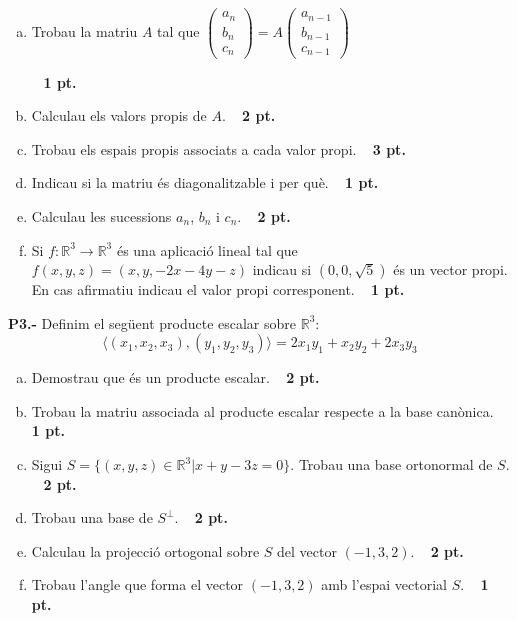 \documentclass{report}
\newcommand\R{\mathbb{R}}
\begin{document}
\begin{enumerate}[a)]
\item Trobau la matriu $A$ tal que 
$\left( \begin{array}{c} a_n \\ b_n \\ c_n \end{array} \right) = A \left( \begin{array}{c} a_{n-1} \\ b_{n-1} \\ c_{n-1} \end{array} \right)$

\ \hfill{\textbf{ 1 pt.}}

\item Calculau els valors propis de $A$.
\ \hfill{\textbf{ 2 pt.}}

\item Trobau els espais propis associats a cada valor propi.
\ \hfill{\textbf{ 3 pt.}}

\item Indicau si la matriu és diagonalitzable i per què.
\ \hfill{\textbf{ 1 pt.}}

\item Calculau les sucessions $a_n$, $b_n$ i $c_n$.
\ \hfill{\textbf{ 2 pt.}}

\item Si $f: \R^3 \rightarrow \R^3$ és una aplicació lineal tal que 
$f(x, y, z)=(x, y, -2x-4y-z)$ indicau si $(0, 0, \sqrt{5})$ és
un vector propi. En cas afirmatiu indicau el valor propi corresponent.
\ \hfill{\textbf{ 1 pt.}}

\end{enumerate}

\vspace{0.5 cm}
\noindent\textbf{P3.-} Definim el següent producte escalar sobre $\R^3$:
\[
\langle (x_1, x_2, x_3), (y_1, y_2, y_3) \rangle = 2x_1y_1+x_2y_2+2x_3y_3
\]

\begin{enumerate}[a)]
\item Demostrau que és un producte escalar.
\ \hfill{\textbf{ 2 pt.}}

\item Trobau la matriu associada al producte escalar respecte a la base canònica.
\ \hfill{\textbf{ 1 pt.}}

\item Sigui $S=\{ (x, y, z) \in \R^3 | x+y-3z=0 \}$. Trobau una base ortonormal de $S$.
\ \hfill{\textbf{ 2 pt.}}

\item Trobau una base de $S^{\perp}$.
\ \hfill{\textbf{ 2 pt.}}

\item Calculau la projecció ortogonal sobre $S$ del vector $(-1, 3, 2)$.
\ \hfill{\textbf{ 2 pt.}}

\item Trobau l'angle que forma el vector $(-1, 3, 2)$ amb l'espai vectorial $S$.
\ \hfill{\textbf{ 1 pt.}}

\end{enumerate}
\end{document}
